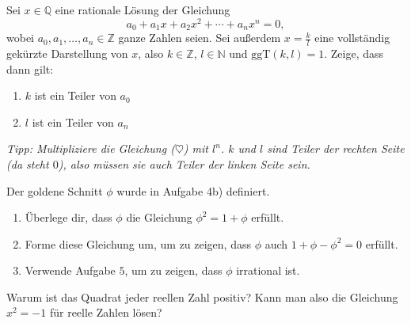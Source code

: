 \documentclass{zusammenfassung}
\begin{document}
\begin{aufgabe}[$(***)$]
	Sei $x\in\mathbb Q$ eine rationale Lösung der Gleichung
	\begin{equation}
		a_0+a_1x+a_2x^2+\cdots+a_nx^n=0,\tag{$\heartsuit$}
	\end{equation}
	wobei $a_0,a_1,\ldots,a_n\in\mathbb Z$ ganze Zahlen seien. Sei außerdem $x=\frac kl$ eine vollständig gekürzte Darstellung von
	$x$, also $k\in\mathbb Z$, $l\in\mathbb N$ und $\text{ggT}(k,l)=1$. Zeige, dass dann gilt:
	\begin{enumerate}
		\item $k$ ist ein Teiler von $a_0$
		\item $l$ ist ein Teiler von $a_n$
	\end{enumerate}
	\emph{Tipp: Multipliziere die Gleichung ($\heartsuit$) mit $l^n$. $k$ und $l$ sind Teiler der rechten Seite (da steht $0$), also
	müssen sie auch Teiler der linken Seite sein.}
\end{aufgabe}

\begin{aufgabe}[$(**)$]
	Der goldene Schnitt $\phi$ wurde in Aufgabe 4b) definiert.
	\begin{enumerate}
		\item Überlege dir, dass $\phi$ die Gleichung $\phi^2=1+\phi$ erfüllt.
		\item Forme diese Gleichung um, um zu zeigen, dass $\phi$ auch $1+\phi-\phi^2=0$ erfüllt.
		\item Verwende Aufgabe $5$, um zu zeigen, dass $\phi$ irrational ist.
	\end{enumerate}
\end{aufgabe}

\begin{aufgabe}[$(*)$]
	Warum ist das Quadrat jeder reellen Zahl positiv? Kann man also die Gleichung $x^2=-1$ für reelle Zahlen lösen?
\end{aufgabe}
\end{document}
